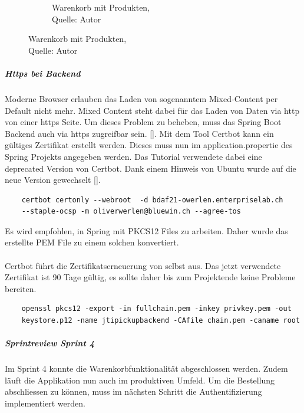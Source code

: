 \begin{figure}[H]
\begin{subfigure}[b]{0.4\textwidth}
		\caption[Warenkorb mit Produkten]{Warenkorb mit Produkten,\\ Quelle: Autor}
		\label{img: cartFull}
	\end{subfigure}
\end{figure} 

\subparagraph{Https bei Backend}\label{httpsBackend}
Moderne Browser erlauben das Laden von sogenanntem Mixed-Content per Default nicht mehr. Mixed Content steht dabei für das Laden von Daten via http von einer https Seite. Um dieses Problem zu beheben, muss das Spring Boot Backend auch via https zugreifbar sein.  [\cite{mixedContent}]. Mit dem Tool Certbot kann ein gültiges Zertifikat erstellt werden. Dieses muss nun im application.propertie des Spring Projekts angegeben werden. Das Tutorial verwendete dabei eine deprecated Version von Certbot. Dank einem Hinweis von Ubuntu wurde auf die neue Version gewechselt [\cite{springSSL}]. 

\begin{verbatim}
	certbot certonly --webroot  -d bdaf21-owerlen.enterpriselab.ch 
	--staple-ocsp -m oliverwerlen@bluewin.ch --agree-tos
\end{verbatim}

Es wird empfohlen, in Spring mit PKCS12 Files zu arbeiten. Daher wurde das erstellte PEM File zu einem solchen konvertiert. \\\\
Certbot führt die Zertifikatserneuerung von selbst aus. Das jetzt verwendete Zertifikat ist 90 Tage gültig, es sollte daher bis zum Projektende keine Probleme bereiten. \\

\begin{verbatim}
	openssl pkcs12 -export -in fullchain.pem -inkey privkey.pem -out 
	keystore.p12 -name jtipickupbackend -CAfile chain.pem -caname root
\end{verbatim}

\subparagraph{Sprintreview Sprint 4}
Im Sprint 4 konnte die Warenkorbfunktionalität abgeschlossen werden. Zudem läuft die Applikation nun auch im produktiven Umfeld.
Um die Bestellung abschliessen zu können, muss im nächsten Schritt die Authentifizierung implementiert werden.  

